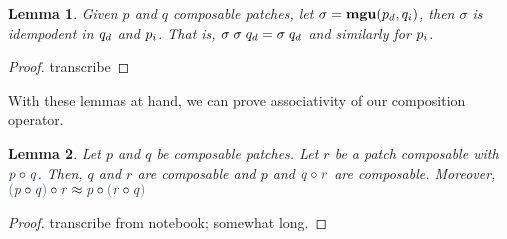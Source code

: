 \documentclass{article}
\theoremstyle{definition}
\theoremstyle{plain}
\newtheorem{lemma}{Lemma}
\newcommand*{\mathcolor}{}
\def\mathcolor#1#{\mathcoloraux{#1}}
\newcommand*{\mathcoloraux}[3]{%
  \protect\leavevmode
  \begingroup
    \color#1{#2}#3%
  \endgroup
}
\newcommand{\HSSpecial}[1]{\mathcolor{hsblue4}{\ensuremath{#1}}}
\newcommand{\HSVar}[1]{\mathcolor{hsblue5}{\mathit{\ensuremath{#1}}}}
\begin{document}
\begin{lemma}
  Given $p$ and $q$ composable patches, let $\sigma = \mathbf{mgu}({p}_d , {q}_i)$,
then $\sigma$ is idempodent in ${q}_d$ and ${p}_i$. That is, $\sigma\;\sigma\;{q}_d = \sigma\;{q}_d$
and similarly for ${p}_i$.
\end{lemma}
\begin{proof}
transcribe
\end{proof}

  With these lemmas at hand, we can prove associativity of our
composition operator.

\begin{lemma}
Let $p$ and $q$ be composable patches. Let $r$ be a patch composable
with \ensuremath{\after{\HSVar{p}}{\HSVar{q}}}. Then, $q$ and $r$ are composable and $p$ and \ensuremath{\after{\HSVar{q}}{\HSVar{r}}}
are composable. Moreover, \ensuremath{\after{\HSSpecial{(}\after{\HSVar{p}}{\HSVar{q}}\HSSpecial{)}}{\HSVar{r}}\approx\after{\HSVar{p}}{\HSSpecial{(}\after{\HSVar{r}}{\HSVar{q}}\HSSpecial{)}}}
\end{lemma}
\begin{proof}
transcribe from notebook; somewhat long.
\end{proof}



%


\end{document}
